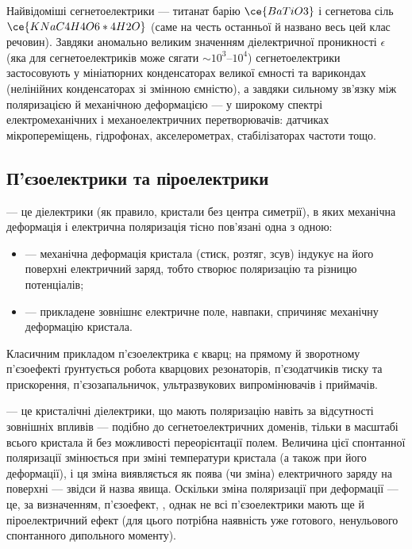 Найвідоміші сегнетоелектрики --- титанат барію $\ce{BaTiO3}$ і сегнетова сіль $\ce{KNaC4H4O6*4H2O}$ (саме на честь останньої й названо весь цей клас
речовин). Завдяки аномально великим значенням діелектричної проникності $\epsilon$ (яка для сегнетоелектриків може сягати $\sim 10^3$--$10^4$)
сегнетоелектрики застосовують у мініатюрних конденсаторах великої ємності та варикондах (нелінійних конденсаторах зі змінною ємністю), а завдяки
сильному зв'язку між поляризацією й механічною деформацією --- у широкому спектрі електромеханічних і механоелектричних перетворювачів: датчиках
мікропереміщень, гідрофонах, акселерометрах, стабілізаторах частоти тощо.

\subsection*{П'єзоелектрики та піроелектрики}\label{sec:PiezoPyro}

 --- це діелектрики (як правило, кристали без центра симетрії), в яких механічна деформація і електрична поляризація тісно
пов'язані одна з одною:
\begin{itemize}
	\item {} --- механічна деформація кристала (стиск, розтяг, зсув) індукує на його поверхні електричний заряд, тобто
	      створює поляризацію та різницю потенціалів;
	\item {} --- прикладене зовнішнє електричне поле, навпаки, спричиняє механічну деформацію кристала.
\end{itemize}
Класичним прикладом п'єзоелектрика є кварц; на прямому й зворотному п'єзоефекті ґрунтується робота кварцових резонаторів, п'єзодатчиків тиску та
прискорення, п'єзозапальничок, ультразвукових випромінювачів і приймачів.

 --- це кристалічні діелектрики, що мають  поляризацію навіть за відсутності зовнішніх впливів --- подібно до
сегнетоелектричних доменів, тільки в масштабі всього кристала й без можливості переорієнтації полем. Величина цієї спонтанної поляризації
змінюється при зміні температури кристала (а також при його деформації), і ця зміна виявляється як поява (чи зміна) електричного заряду на
поверхні --- звідси й назва явища. Оскільки зміна поляризації при деформації --- це, за визначенням, п'єзоефект, , однак не всі п'єзоелектрики мають ще й піроелектричний ефект (для цього потрібна наявність уже готового, ненульового
спонтанного дипольного моменту).

